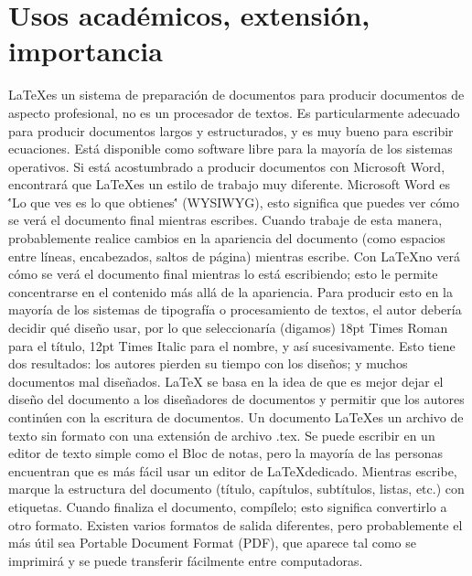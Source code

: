 \documentclass[letterpaper, 10pt, journal]{IEEEtran}
\begin{document}
\section{Usos acad\'emicos, extensi\'on, importancia}
\LaTeX    es un sistema de preparaci\'on de documentos para producir documentos de aspecto profesional, no es un procesador de textos. Es particularmente adecuado para producir documentos largos y estructurados, y es muy bueno para escribir ecuaciones. Est\'a disponible como software libre para la mayor\'ia de los sistemas operativos.
\newline
Si est\'a acostumbrado a producir documentos con Microsoft Word, encontrar\'a que \LaTeX   es un estilo de trabajo muy diferente. Microsoft Word es \''Lo que ves es lo que obtienes\'' (WYSIWYG), esto significa que puedes ver c\'omo se ver\'a el documento final mientras escribes. Cuando trabaje de esta manera, probablemente realice cambios en la apariencia del documento (como espacios entre l\'ineas, encabezados, saltos de p\'agina) mientras escribe. Con \LaTeX   no ver\'a c\'omo se ver\'a el documento final mientras lo est\'a escribiendo; esto le permite concentrarse en el contenido m\'as all\'a de la apariencia.
Para producir esto en la mayor\'ia de los sistemas de tipograf\'ia o procesamiento de textos, el autor deber\'ia decidir qu\'e dise\~no usar, por lo que seleccionar\'ia (digamos) 18pt Times Roman para el t\'itulo, 12pt Times Italic para el nombre, y as\'i sucesivamente. Esto tiene dos resultados: los autores pierden su tiempo con los dise\~nos; y muchos documentos mal dise\~nados. \cite{[2]}
LaTeX se basa en la idea de que es mejor dejar el diseño del documento a los diseñadores de documentos y permitir que los autores continúen con la escritura de documentos. \cite{[2]}
\newline
Un documento \LaTeX   es un archivo de texto sin formato con una extensi\'on de archivo .tex. Se puede escribir en un editor de texto simple como el Bloc de notas, pero la mayor\'ia de las personas encuentran que es m\'as f\'acil usar un editor de \LaTeX   dedicado. Mientras escribe, marque la estructura del documento (t\'itulo, cap\'itulos, subt\'itulos, listas, etc.) con etiquetas. Cuando finaliza el documento, comp\'ilelo; esto significa convertirlo a otro formato. \cite{[2]}
\newline
Existen varios formatos de salida diferentes, pero probablemente el m\'as \'util sea Portable Document Format (PDF), que aparece tal como se imprimir\'a y se puede transferir f\'acilmente entre computadoras. \cite{[2]}
\end{document}
